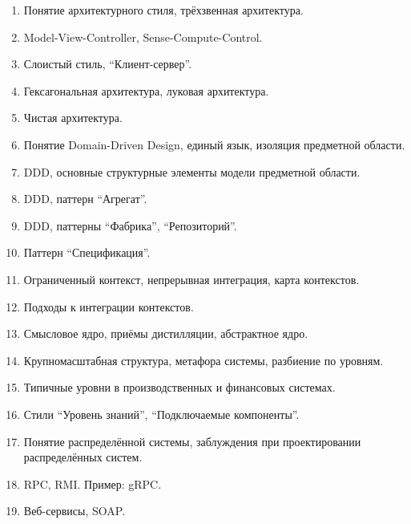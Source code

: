 \documentclass[a5paper]{article}
\begin{document}
\begin{enumerate}
    \item Понятие архитектурного стиля, трёхзвенная архитектура.
    \item Model-View-Controller, Sense-Compute-Control.
    \item Слоистый стиль, \enquote{Клиент-сервер}.
    \item Гексагональная архитектура, луковая архитектура.
    \item Чистая архитектура.
    \item Понятие Domain-Driven Design, единый язык, изоляция предметной области.
    \item DDD, основные структурные элементы модели предметной области.
    \item DDD, паттерн \enquote{Агрегат}.
    \item DDD, паттерны \enquote{Фабрика}, \enquote{Репозиторий}.
    \item Паттерн \enquote{Спецификация}.
	\item Ограниченный контекст, непрерывная интеграция, карта контекстов.
    \item Подходы к интеграции контекстов.
    \item Смысловое ядро, приёмы дистилляции, абстрактное ядро.
    \item Крупномасштабная структура, метафора системы, разбиение по уровням. 
    \item Типичные уровни в производственных и финансовых системах.
    \item Стили \enquote{Уровень знаний}, \enquote{Подключаемые компоненты}.
    \item Понятие распределённой системы, заблуждения при проектировании распределённых систем.
    \item RPC, RMI. Пример: gRPC.
    \item Веб-сервисы, SOAP. %

\end{enumerate}
\end{document}
